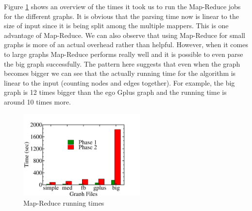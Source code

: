 Figure \ref{fig:mapreduce_graph} shows an overview of the times it took us to run the Map-Reduce jobs for the different graphs. It is obvious that the parsing time now is linear to the size of input since it is being split among the multiple mappers. This is one advantage of Map-Reduce. We can also observe that using Map-Reduce for small graphs is more of an actual overhead rather than helpful. However, when it comes to large graphs Map-Reduce performs really well and it is possible to even parse the big graph successfully. The pattern here suggests that even when the graph becomes bigger we can see that the actually running time for the algorithm is linear to the input (counting nodes and edges together). For example, the big graph is 12 times bigger than the ego Gplus graph and the running time is around 10 times more.

\begin{figure}[!h]
 \centering
    \includegraphics[width=15pc]{figures/mapreduce_graph}
	\caption{Map-Reduce running times}
    \label{fig:mapreduce_graph}
\end{figure}

